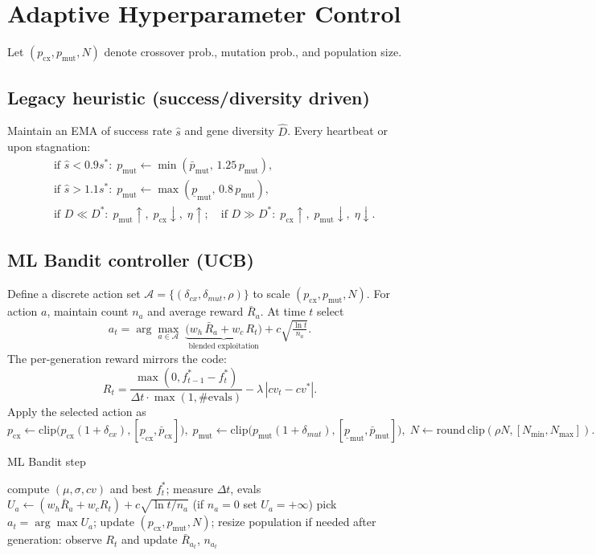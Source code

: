 \documentclass[12pt,a4paper]{article}
\begin{document}
\section{Adaptive Hyperparameter Control}
Let $(p_{\text{cx}},p_{\text{mut}},N)$ denote crossover prob., mutation prob., and population size.

\subsection{Legacy heuristic (success/diversity driven)}
Maintain an EMA of success rate $\hat{s}$ and gene diversity $\hat{D}$. Every heartbeat or upon stagnation:
\begin{align*}
&\text{if } \hat{s} < 0.9 s^*:\; p_{\text{mut}} \leftarrow \min(\bar{p}_{\text{mut}},\, 1.25\, p_{\text{mut}}),\\
&\text{if } \hat{s} > 1.1 s^*:\; p_{\text{mut}} \leftarrow \max(\underline{p}_{\text{mut}},\, 0.8\, p_{\text{mut}}),\\
&\text{if } D \ll D^*:\; p_{\text{mut}}\uparrow,\; p_{\text{cx}}\downarrow,\; \eta\uparrow;\quad \text{if } D \gg D^*:\; p_{\text{cx}}\uparrow,\; p_{\text{mut}}\downarrow,\; \eta\downarrow.
\end{align*}

\subsection{ML Bandit controller (UCB)}
Define a discrete action set $\mathcal{A}=\{(\delta_{cx},\delta_{mut},\rho)\}$ to scale $(p_{\text{cx}},p_{\text{mut}},N)$. For action $a$, maintain count $n_a$ and average reward $\bar{R}_a$. At time $t$ select
\[ a_t = \arg\max_{a\in\mathcal{A}}\; \underbrace{\big(w_h\,\bar{R}_a + w_c\,R_t\big)}_{\text{blended exploitation}} + c\sqrt{\tfrac{\ln t}{n_a}}. \]
The per-generation reward mirrors the code:
\[ R_t = \frac{\max(0, f^*_{t-1}-f^*_t)}{\Delta t \cdot \max(1,\#\text{evals})} - \lambda\,|cv_t - cv^*|. \]
Apply the selected action as
\[ p_{\text{cx}} \leftarrow \mathrm{clip}\big(p_{\text{cx}}(1+\delta_{cx}),[\underline{p}_{\text{cx}},\bar{p}_{\text{cx}}]\big),\; p_{\text{mut}} \leftarrow \mathrm{clip}\big(p_{\text{mut}}(1+\delta_{mut}),[\underline{p}_{\text{mut}},\bar{p}_{\text{mut}}]\big),\; N\leftarrow \mathrm{round}\,\mathrm{clip}(\rho N,[N_{\min},N_{\max}]). \]

\begin{algorithm}[H]
\caption{ML Bandit step}
\begin{algorithmic}[1]
\State compute $(\mu,\sigma,cv)$ and best $f^*_t$; measure $\Delta t$, evals
\State $U_a \leftarrow (w_h\bar{R}_a + w_c R_t) + c\sqrt{\ln t / n_a}$ (if $n_a=0$ set $U_a=+\infty$)
\EndFor
\State pick $a_t=\arg\max U_a$; update $(p_{\text{cx}},p_{\text{mut}},N)$; resize population if needed
\State after generation: observe $R_t$ and update $\bar{R}_{a_t}$, $n_{a_t}$
\end{algorithmic}
\end{algorithm}
\end{document}
